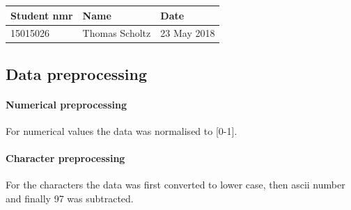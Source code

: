 \documentclass[11pt]{article}
\begin{document}
\begin{longtable}[]{@{}lll@{}}
\toprule
Student nmr & Name & Date\tabularnewline
\midrule
\endhead
15015026 & Thomas Scholtz & 23 May 2018\tabularnewline
\bottomrule
\end{longtable}

    \hypertarget{data-preprocessing}{%
\subsection{Data preprocessing}\label{data-preprocessing}}

\hypertarget{numerical-preprocessing}{%
\paragraph{Numerical preprocessing}\label{numerical-preprocessing}}

For numerical values the data was normalised to {[}0-1{]}.

\hypertarget{character-preprocessing}{%
\paragraph{Character preprocessing}\label{character-preprocessing}}

For the characters the data was first converted to lower case, then
ascii number and finally 97 was subtracted.
\end{document}
